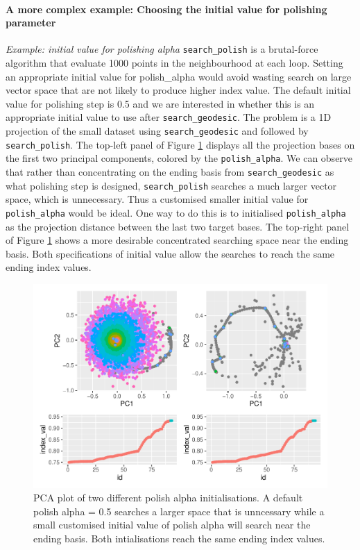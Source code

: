 \documentclass[12pt]{article}
\begin{document}
\hypertarget{a-more-complex-example-choosing-the-initial-value-for-polishing-parameter}{%
\paragraph{A more complex example: Choosing the initial value for
polishing
parameter}\label{a-more-complex-example-choosing-the-initial-value-for-polishing-parameter}}

\emph{Example: initial value for polishing alpha}
\texttt{search\_polish} is a brutal-force algorithm that evaluate 1000
points in the neighbourhood at each loop. Setting an appropriate initial
value for polish\_alpha would avoid wasting search on large vector space
that are not likely to produce higher index value. The default initial
value for polishing step is 0.5 and we are interested in whether this is
an appropriate initial value to use after \texttt{search\_geodesic}. The
problem is a 1D projection of the small dataset using
\texttt{search\_geodesic} and followed by \texttt{search\_polish}. The
top-left panel of Figure \ref{polish-alpha} displays all the projection
bases on the first two principal components, colored by the
\texttt{polish\_alpha}. We can observe that rather than concentrating on
the ending basis from \texttt{search\_geodesic} as what polishing step
is designed, \texttt{search\_polish} searches a much larger vector
space, which is unnecessary. Thus a customised smaller initial value for
\texttt{polish\_alpha} would be ideal. One way to do this is to
initialised \texttt{polish\_alpha} as the projection distance between
the last two target bases. The top-right panel of Figure
\ref{polish-alpha} shows a more desirable concentrated searching space
near the ending basis. Both specifications of initial value allow the
searches to reach the same ending index values.

\begin{figure}
\centering
\includegraphics{paper_files/figure-latex/polish-alpha-1.pdf}
\caption{\label{polish-alpha}PCA plot of two different polish alpha
initialisations. A default polish alpha = 0.5 searches a larger space
that is unncessary while a small customised initial value of polish
alpha will search near the ending basis. Both intialisations reach the
same ending index values.}
\end{figure}
\end{document}
